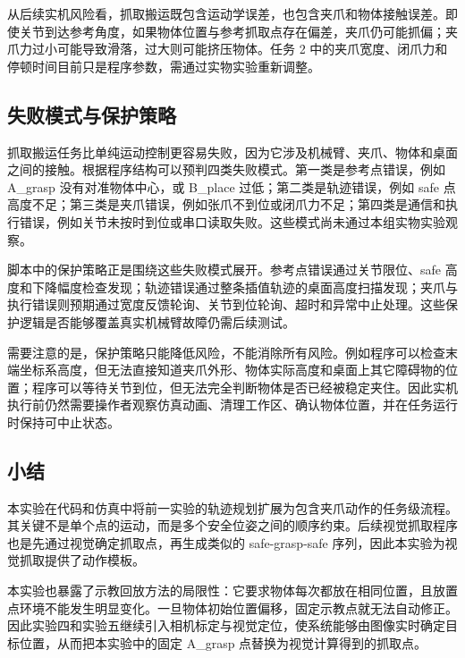从后续实机风险看，抓取搬运既包含运动学误差，也包含夹爪和物体接触误差。即使关节到达参考角度，如果物体位置与参考抓取点存在偏差，夹爪仍可能抓偏；夹爪力过小可能导致滑落，过大则可能挤压物体。任务 2 中的夹爪宽度、闭爪力和停顿时间目前只是程序参数，需通过实物实验重新调整。

\subsection{失败模式与保护策略}

抓取搬运任务比单纯运动控制更容易失败，因为它涉及机械臂、夹爪、物体和桌面之间的接触。根据程序结构可以预判四类失败模式。第一类是参考点错误，例如 A\_grasp 没有对准物体中心，或 B\_place 过低；第二类是轨迹错误，例如 safe 点高度不足；第三类是夹爪错误，例如张爪不到位或闭爪力不足；第四类是通信和执行错误，例如关节未按时到位或串口读取失败。这些模式尚未通过本组实物实验观察。

脚本中的保护策略正是围绕这些失败模式展开。参考点错误通过关节限位、safe 高度和下降幅度检查发现；轨迹错误通过整条插值轨迹的桌面高度扫描发现；夹爪与执行错误则预期通过宽度反馈轮询、关节到位轮询、超时和异常中止处理。这些保护逻辑是否能够覆盖真实机械臂故障仍需后续测试。

需要注意的是，保护策略只能降低风险，不能消除所有风险。例如程序可以检查末端坐标系高度，但无法直接知道夹爪外形、物体实际高度和桌面上其它障碍物的位置；程序可以等待关节到位，但无法完全判断物体是否已经被稳定夹住。因此实机执行前仍然需要操作者观察仿真动画、清理工作区、确认物体位置，并在任务运行时保持可中止状态。

\subsection{小结}

本实验在代码和仿真中将前一实验的轨迹规划扩展为包含夹爪动作的任务级流程。其关键不是单个点的运动，而是多个安全位姿之间的顺序约束。后续视觉抓取程序也是先通过视觉确定抓取点，再生成类似的 safe-grasp-safe 序列，因此本实验为视觉抓取提供了动作模板。

本实验也暴露了示教回放方法的局限性：它要求物体每次都放在相同位置，且放置点环境不能发生明显变化。一旦物体初始位置偏移，固定示教点就无法自动修正。因此实验四和实验五继续引入相机标定与视觉定位，使系统能够由图像实时确定目标位置，从而把本实验中的固定 A\_grasp 点替换为视觉计算得到的抓取点。
